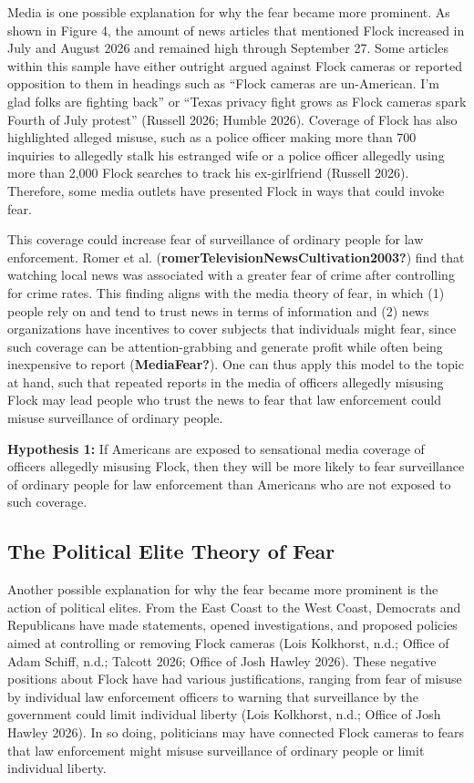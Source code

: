 \documentclass[
  american,
  12pt,
  letterpaper,
]{article}
\renewenvironment{quote}
  {
    \par
    \addvspace{\baselineskip}
    \begin{singlespace}
    \begin{list}{}{%
      \setlength{\leftmargin}{0.5in}%
      \setlength{\rightmargin}{0in}%
      \setlength{\topsep}{0pt}%
      \setlength{\partopsep}{0pt}%
      \setlength{\parsep}{0pt}%
      \setlength{\itemsep}{0pt}%
    }
    \item\relax
  }
  {
    \end{list}
    \end{singlespace}
    \par
    \addvspace{\baselineskip}
  }
\begin{document}
Media is one possible explanation for why the fear became more
prominent. As shown in Figure 4, the amount of news articles that
mentioned Flock increased in July and August 2026 and remained high
through September 27. Some articles within this sample have either
outright argued against Flock cameras or reported opposition to them in
headings such as ``Flock cameras are un-American. I'm glad folks are
fighting back'' or ``Texas privacy fight grows as Flock cameras spark
Fourth of July protest'' (Russell 2026; Humble 2026). Coverage of Flock
has also highlighted alleged misuse, such as a police officer making
more than 700 inquiries to allegedly stalk his estranged wife or a
police officer allegedly using more than 2,000 Flock searches to track
his ex-girlfriend (Russell 2026). Therefore, some media outlets have
presented Flock in ways that could invoke fear.

This coverage could increase fear of surveillance of ordinary people for
law enforcement. Romer et al.
(\textbf{romerTelevisionNewsCultivation2003?}) find that watching local
news was associated with a greater fear of crime after controlling for
crime rates. This finding aligns with the media theory of fear, in which
(1) people rely on and tend to trust news in terms of information and
(2) news organizations have incentives to cover subjects that
individuals might fear, since such coverage can be attention-grabbing
and generate profit while often being inexpensive to report
(\textbf{MediaFear?}). One can thus apply this model to the topic at
hand, such that repeated reports in the media of officers allegedly
misusing Flock may lead people who trust the news to fear that law
enforcement could misuse surveillance of ordinary people.

\begin{quote}
\textbf{Hypothesis 1:} If Americans are exposed to sensational media
coverage of officers allegedly misusing Flock, then they will be more
likely to fear surveillance of ordinary people for law enforcement than
Americans who are not exposed to such coverage.
\end{quote}

\subsection{The Political Elite Theory of
Fear}\label{the-political-elite-theory-of-fear}

Another possible explanation for why the fear became more prominent is
the action of political elites. From the East Coast to the West Coast,
Democrats and Republicans have made statements, opened investigations,
and proposed policies aimed at controlling or removing Flock cameras
(Lois Kolkhorst, n.d.; Office of Adam Schiff, n.d.; Talcott 2026; Office
of Josh Hawley 2026). These negative positions about Flock have had
various justifications, ranging from fear of misuse by individual law
enforcement officers to warning that surveillance by the government
could limit individual liberty (Lois Kolkhorst, n.d.; Office of Josh
Hawley 2026). In so doing, politicians may have connected Flock cameras
to fears that law enforcement might misuse surveillance of ordinary
people or limit individual liberty.
\end{document}
